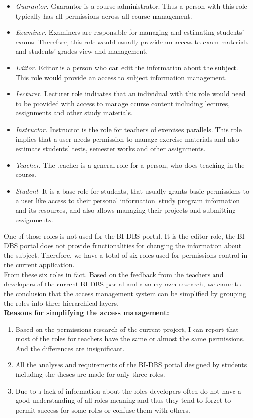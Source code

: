 \begin{itemize}
    \item \emph{Guarantor.} Guarantor is a course administrator. Thus a person with this role typically has all permissions across all course management.
    \item \emph{Examiner.} Examiners are responsible for managing and estimating students' exams. Therefore, this role would usually provide an access to exam materials and students' grades view and management.
    \item \emph{Editor.} Editor is a person who can edit the information about the subject. This role would provide an access to subject information management.
    \item \emph{Lecturer.} Lecturer role indicates that an individual with this role would need to be provided with access to manage course content including lectures, assignments and other study materials.
    \item \emph{Instructor.} Instructor is the role for teachers of exercises parallels. This role implies that a user needs permission to manage exercise materials and also estimate students' tests, semester works and other assignments.
    \item \emph{Teacher.} The teacher is a general role for a person, who does teaching in the course. 
    \item \emph{Student.} It is a base role for students, that usually grants basic permissions to a user like access to their personal information, study program information and its resources, and also allows managing their projects and submitting assignments.
\end{itemize}


\noindent One of those roles is not used for the BI-DBS portal. It is the editor role, the BI-DBS portal does not provide functionalities for changing the information about the subject. Therefore, we have a total of six roles used for permissions control in the current application.\\  
From these six roles in fact. Based on the feedback from the teachers and developers of the current BI-DBS portal and also my own research, we came to the conclusion that the access management system can be simplified by grouping the roles into three hierarchical layers.\\

\noindent \textbf{Reasons for simplifying the access management:}

\begin{enumerate}
    \item Based on the permissions research of the current project, I can report that most of the roles for teachers have the same or almost the same permissions. And the differences are insignificant.
    \item All the analyses and requirements of the BI-DBS portal designed by students including the theses are made for only three roles.
    \item Due to a lack of information about the roles developers often do not have a good understanding of all roles meaning and thus they tend to forget to permit success for some roles or confuse them with others.
\end{enumerate}

